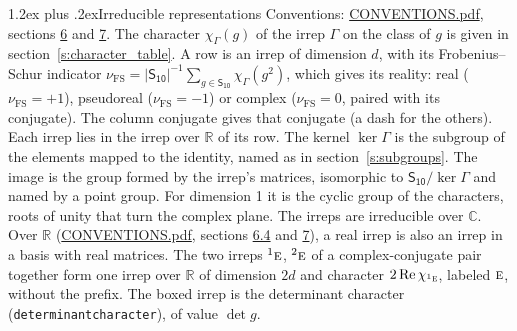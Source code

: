 \documentclass[10pt,a4paper]{article}
\makeatletter
\renewcommand\section{\@startsection{section}{1}{\z@}{-3ex plus -1ex minus -.2ex}%
  {1.2ex plus .2ex}{\normalfont\large\sffamily\bfseries\color{parttitle}}}
\numberwithin{equation}{section}
\newcommand{\grp}[1]{\mathsf{#1}}
\newcommand{\irr}[1]{\text{\normalfont\scshape #1}}
\newcommand{\conjpair}[1]{{}^{#1}}
\newcommand{\irchar}[1]{\chi_{#1}}
\newcommand{\fsind}{\nu_{\mathrm{FS}}}
\makeatother
\begin{document}
\section{Irreducible representations}\label{s:irreps}
Conventions: \href{../../CONVENTIONS.pdf}{CONVENTIONS.pdf}, sections \href{../../CONVENTIONS.pdf\#conv.6}{6} and \href{../../CONVENTIONS.pdf\#conv.7}{7}.
\leavevmode\label{n:function.character}\label{n:irrep.Gamma}The character $\irchar{\Gamma}(g)$ of the irrep $\Gamma$ on the class of $g$ is given in section~\ref{s:character_table}.
\leavevmode\label{n:index.dimension}\label{n:index.frobenius}\label{n:head.irrep}\label{n:head.reality}A row is an irrep of dimension $d$, with its Frobenius--Schur indicator $\fsind = |\grp{S_{10}}|^{-1}\allowbreak\sum_{g\in\grp{S_{10}}}\irchar{\Gamma}(g^2)$, which gives its reality: real ($\fsind = +1$), pseudoreal ($\fsind = -1$) or complex ($\fsind = 0$, paired with its conjugate). \label{n:head.conjugate}The column conjugate gives that conjugate (a dash for the others). \label{n:head.over.real}Each irrep lies in the irrep over $\mathbb{R}$ of its row. \label{n:head.kernel}The kernel $\ker\Gamma$ is the subgroup of the elements mapped to the identity, named as in section~\ref{s:subgroups}. \label{n:head.image}The image is the group formed by the irrep's matrices, isomorphic to $\grp{S_{10}}/\ker\Gamma$ and named by a point group. For dimension 1 it is the cyclic group of the characters, roots of unity that turn the complex plane. The irreps are irreducible over $\mathbb{C}$. Over $\mathbb{R}$ (\href{../../CONVENTIONS.pdf}{CONVENTIONS.pdf}, sections \href{../../CONVENTIONS.pdf\#conv.6.4}{6.4} and \href{../../CONVENTIONS.pdf\#conv.7}{7}), a real irrep is also an irrep in a basis with real matrices. The two irreps $\conjpair{1}\irr{e}$, $\conjpair{2}\irr{e}$ of a complex-conjugate pair together form one irrep over $\mathbb{R}$ of dimension $2d$ and character $2\operatorname{Re}\irchar{\conjpair{1}\irr{e}}$, labeled $\irr{e}$, without the prefix. \label{n:mark.determinant}The boxed irrep is the determinant character (\texttt{determinantcharacter}), of value $\det g$.
\setlength{\emergencystretch}{2em}\par\setlength{\emergencystretch}{0pt}
\end{document}

